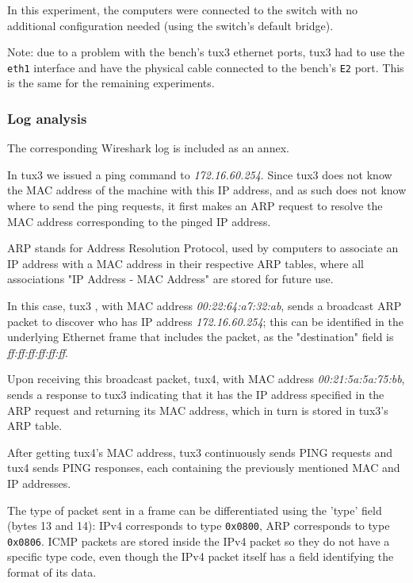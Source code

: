 \documentclass[11pt,a4paper,twocolumn]{article}
\begin{document}
In this experiment, the computers were connected to the switch with no additional configuration needed (using the switch's default bridge).

Note: due to a problem with the bench's tux3 ethernet ports, tux3 had to use the \lstinline{eth1} interface and have the physical cable connected to the bench's \lstinline{E2} port. This is the same for the remaining experiments.

\subsubsection{Log analysis}

The corresponding Wireshark log is included as an annex.

In tux3 we issued a ping command to \textit{172.16.60.254}.
Since tux3 does not know the MAC address of the machine with this IP address, and as such does not know where to send the ping requests, it first makes an ARP request to resolve the MAC address corresponding to the pinged IP address.

ARP stands for Address Resolution Protocol, used by computers to associate an IP address with a MAC address in their respective ARP tables, where all associations "IP Address - MAC Address" are stored for future use.

In this case, tux3 , with MAC address \textit{00:22:64:a7:32:ab}, sends a broadcast ARP packet to discover who has IP address \textit{172.16.60.254}; this can be identified in the underlying Ethernet frame that includes the packet, as the "destination" field is \textit{ff:ff:ff:ff:ff:ff}.

Upon receiving this broadcast packet, tux4, with MAC address \textit{00:21:5a:5a:75:bb}, sends a response to tux3 indicating that it has the IP address specified in the ARP request and returning its MAC address, which in turn is stored in tux3's ARP table.

After getting tux4's MAC address, tux3 continuously sends PING requests and tux4 sends PING responses, each containing the previously mentioned MAC and IP addresses.

The type of packet sent in a frame can be differentiated using the 'type' field (bytes 13 and 14): IPv4 corresponds to type \lstinline{0x0800}, ARP corresponds to type \lstinline{0x0806}. ICMP packets are stored inside the IPv4 packet so they do not have a specific type code, even though the IPv4 packet itself has a field identifying the format of its data.
\end{document}
